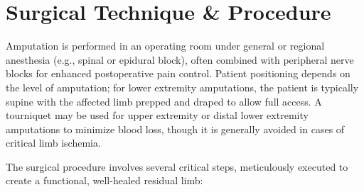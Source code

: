 \section*{Surgical Technique \& Procedure}
Amputation is performed in an operating room under general or regional anesthesia (e.g., spinal or epidural block), often combined with peripheral nerve blocks for enhanced postoperative pain control. Patient positioning depends on the level of amputation; for lower extremity amputations, the patient is typically supine with the affected limb prepped and draped to allow full access. A tourniquet may be used for upper extremity or distal lower extremity amputations to minimize blood loss, though it is generally avoided in cases of critical limb ischemia.

The surgical procedure involves several critical steps, meticulously executed to create a functional, well-healed residual limb:

